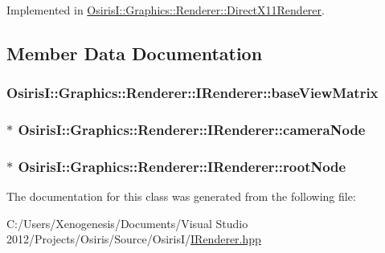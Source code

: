 Implemented in \hyperlink{class_osiris_i_1_1_graphics_1_1_renderer_1_1_direct_x11_renderer_afbe5446f10c23c3e19a4d2fab192cabb}{Osiris\-I\-::\-Graphics\-::\-Renderer\-::\-Direct\-X11\-Renderer}.



\subsection{Member Data Documentation}
\hypertarget{class_osiris_i_1_1_graphics_1_1_renderer_1_1_i_renderer_a7abb76a8ff2d8d056609e430babdcef4}{
\subsubsection[{base\-View\-Matrix}]{ Osiris\-I\-::\-Graphics\-::\-Renderer\-::\-I\-Renderer\-::base\-View\-Matrix\hspace{0.3cm}{\ttfamily [protected]}}}\label{class_osiris_i_1_1_graphics_1_1_renderer_1_1_i_renderer_a7abb76a8ff2d8d056609e430babdcef4}
\hypertarget{class_osiris_i_1_1_graphics_1_1_renderer_1_1_i_renderer_af2af2a7bd5fb61a0067fc4f3e69b9761}{
\subsubsection[{camera\-Node}]{$\ast$ Osiris\-I\-::\-Graphics\-::\-Renderer\-::\-I\-Renderer\-::camera\-Node\hspace{0.3cm}{\ttfamily [protected]}}}\label{class_osiris_i_1_1_graphics_1_1_renderer_1_1_i_renderer_af2af2a7bd5fb61a0067fc4f3e69b9761}
\hypertarget{class_osiris_i_1_1_graphics_1_1_renderer_1_1_i_renderer_a402abcc0f06b70e7eea0706ac905c846}{
\subsubsection[{root\-Node}]{$\ast$ Osiris\-I\-::\-Graphics\-::\-Renderer\-::\-I\-Renderer\-::root\-Node\hspace{0.3cm}{\ttfamily [protected]}}}\label{class_osiris_i_1_1_graphics_1_1_renderer_1_1_i_renderer_a402abcc0f06b70e7eea0706ac905c846}


The documentation for this class was generated from the following file\-:\begin{DoxyCompactItemize}
\item 
C\-:/\-Users/\-Xenogenesis/\-Documents/\-Visual Studio 2012/\-Projects/\-Osiris/\-Source/\-Osiris\-I/\hyperlink{_i_renderer_8hpp}{I\-Renderer.\-hpp}\end{DoxyCompactItemize}
